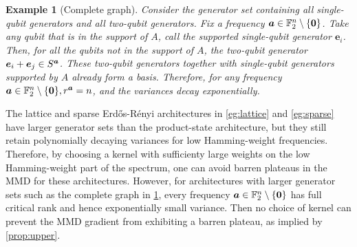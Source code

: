 \documentclass{article}
\theoremstyle{plain}
\newtheorem{example}[theorem]{Example}
\theoremstyle{definition}
\theoremstyle{remark}
\begin{document}
\begin{example}[Complete graph] \label{eg:complete} Consider the generator set containing all single-qubit generators and all two-qubit generators. Fix a frequency ${\bm{a}} \in \mathbb{F}_2^n \setminus \{\bm{0}\}$. Take any qubit that is in the support of $A$, call the supported single-qubit generator $\bm{e}_i$. Then, for all the qubits not in the support of $A$, the two-qubit generator $\bm{e}_i+\bm{e}_j \in S^{\bm{a}}$. These two-qubit generators together with single-qubit generators supported by $A$ already form a basis. Therefore, for any frequency ${\bm{a}} \in \mathbb{F}_2^n \setminus \{\bm{0}\}, r^{\bm{a}} =n$, and the variances decay exponentially. 
\end{example}

The lattice and sparse Erd\H os-R\'enyi architectures in \cref{eg:lattice} and \cref{eg:sparse} have larger generator sets than the product-state architecture, but they still retain polynomially decaying variances for low Hamming-weight frequencies. Therefore, by choosing a kernel with sufficienty large weights on the low Hamming-weight part of the spectrum, one can avoid barren plateaus in the MMD for these architectures. However, for architectures with larger generator sets such as the complete graph in \cref{eg:complete}, every frequency ${\bm{a}} \in \mathbb{F}_2^n \setminus \{\bm{0}\}$ has full critical rank and hence exponentially small variance. Then no choice of kernel can prevent the MMD gradient from exhibiting a barren plateau, as implied by \cref{prop:upper}. 

 
\end{document}
